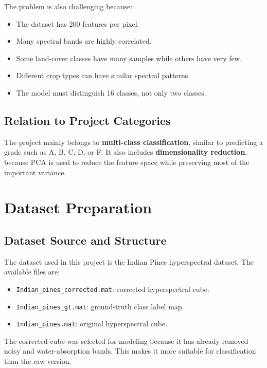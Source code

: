 \documentclass[12pt,a4paper]{article}
\begin{document}
The problem is also challenging because:

\begin{itemize}
    \item The dataset has 200 features per pixel.
    \item Many spectral bands are highly correlated.
    \item Some land-cover classes have many samples while others have very few.
    \item Different crop types can have similar spectral patterns.
    \item The model must distinguish 16 classes, not only two classes.
\end{itemize}

\subsection{Relation to Project Categories}

The project mainly belongs to \textbf{multi-class classification}, similar to predicting a grade such as A, B, C, D, or F. It also includes \textbf{dimensionality reduction}, because PCA is used to reduce the feature space while preserving most of the important variance.

\section{Dataset Preparation}

\subsection{Dataset Source and Structure}

The dataset used in this project is the Indian Pines hyperspectral dataset. The available files are:

\begin{itemize}
    \item \texttt{Indian\_pines\_corrected.mat}: corrected hyperspectral cube.
    \item \texttt{Indian\_pines\_gt.mat}: ground-truth class label map.
    \item \texttt{Indian\_pines.mat}: original hyperspectral cube.
\end{itemize}

The corrected cube was selected for modeling because it has already removed noisy and water-absorption bands. This makes it more suitable for classification than the raw version.
\end{document}
